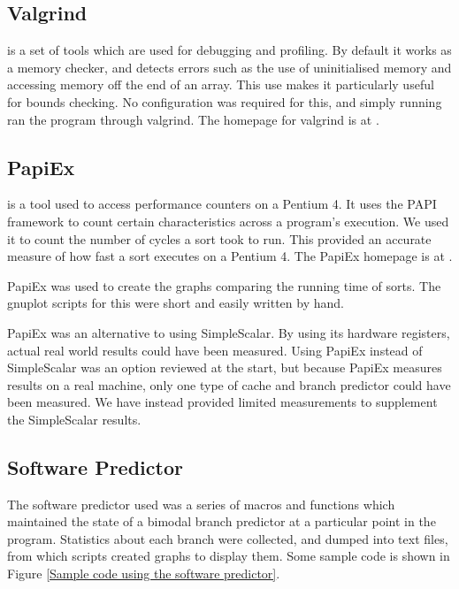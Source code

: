\subsection{Valgrind}
\label{Valgrind}
 is a set of tools which are used for debugging and profiling.  By
default it works as a memory checker, and detects errors such as the use of
uninitialised memory and accessing memory off the end of an array. This use
makes it particularly useful for bounds checking. No configuration was required
for this, and simply running  ran the program through
valgrind. The homepage for valgrind is at .

\subsection{PapiEx}
 is a tool used to access performance counters on a Pentium 4. It
uses the PAPI framework to count certain characteristics across a program's
execution. We used it to count the number of cycles a sort took to run. This
provided an accurate measure of how fast a sort executes on a Pentium 4. The
PapiEx homepage is at .

PapiEx was used to create the graphs comparing the running time of sorts.
The gnuplot scripts for this were short and easily written by hand.

PapiEx was an alternative to using SimpleScalar. By using its hardware
registers, actual real world results could have been measured. Using PapiEx
instead of SimpleScalar was an option reviewed at the start, but because PapiEx
measures results on a real machine, only one type of cache and branch predictor
could have been measured. We have instead provided limited measurements to
supplement the SimpleScalar results.

\subsection{Software Predictor}
The software predictor used was a series of macros and functions which
maintained the state of a bimodal branch predictor at a particular point in the
program. Statistics about each branch were collected, and dumped into text
files, from which scripts created graphs to display them. Some sample code is
shown in Figure \ref{Sample code using the software predictor}.


